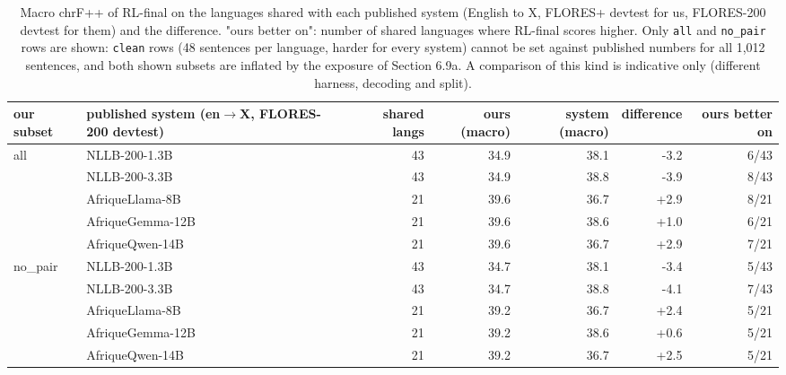 \begin{table}[t]
\centering
\footnotesize
\setlength{\tabcolsep}{3pt}
\caption{Macro chrF++ of RL-final on the languages shared with each published system (English to X, FLORES+ devtest for us, FLORES-200 devtest for them) and the difference. "ours better on": number of shared languages where RL-final scores higher. Only \texttt{all} and \texttt{no\_pair} rows are shown: \texttt{clean} rows (48 sentences per language, harder for every system) cannot be set against published numbers for all 1,012 sentences, and both shown subsets are inflated by the exposure of Section 6.9a. A comparison of this kind is indicative only (different harness, decoding and split).}
\label{tab:t_published}
\begin{adjustbox}{max width=\linewidth}
{\def\LTcaptype{none} %
\begin{tabular}{@{}llrrrrr@{}}
\toprule
our subset & published system (en\(\to\)X, FLORES-200 devtest) & shared langs & ours (macro) & system (macro) & difference & ours better on \\
\midrule
all & NLLB-200-1.3B & 43 & 34.9 & 38.1 & -3.2 & 6/43 \\
& NLLB-200-3.3B & 43 & 34.9 & 38.8 & -3.9 & 8/43 \\
& AfriqueLlama-8B & 21 & 39.6 & 36.7 & +2.9 & 8/21 \\
& AfriqueGemma-12B & 21 & 39.6 & 38.6 & +1.0 & 6/21 \\
& AfriqueQwen-14B & 21 & 39.6 & 36.7 & +2.9 & 7/21 \\
no\_pair & NLLB-200-1.3B & 43 & 34.7 & 38.1 & -3.4 & 5/43 \\
& NLLB-200-3.3B & 43 & 34.7 & 38.8 & -4.1 & 7/43 \\
& AfriqueLlama-8B & 21 & 39.2 & 36.7 & +2.4 & 5/21 \\
& AfriqueGemma-12B & 21 & 39.2 & 38.6 & +0.6 & 5/21 \\
& AfriqueQwen-14B & 21 & 39.2 & 36.7 & +2.5 & 5/21 \\
\bottomrule
\end{tabular}
}
\end{adjustbox}
\end{table}

